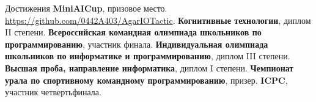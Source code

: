 \begin{rubric}{Достижения}
\entry*[2018]
	\textbf{MiniAICup}, призовое место. \url{https://github.com/0442A403/AgarIOTactic}.
\entry*[2018]
	\textbf{Когнитивные технологии}, диплом II степени.
\entry*[2018]
	\textbf{Всероссийская командная олимпиада школьников по программированию}, участник финала.
\entry*[2019]
	\textbf{Индивидуальная олимпиада школьников по информатике и программированию}, диплом III степени.
\entry*[2019]
	\textbf{Высшая проба, направление информатика}, диплом I степени.
\entry*[2019]
	\textbf{Чемпионат урала по спортивному командному программированию}, призер.
\entry*[2020]
	\textbf{ICPC}, участник четвертьфинала.
\end{rubric}